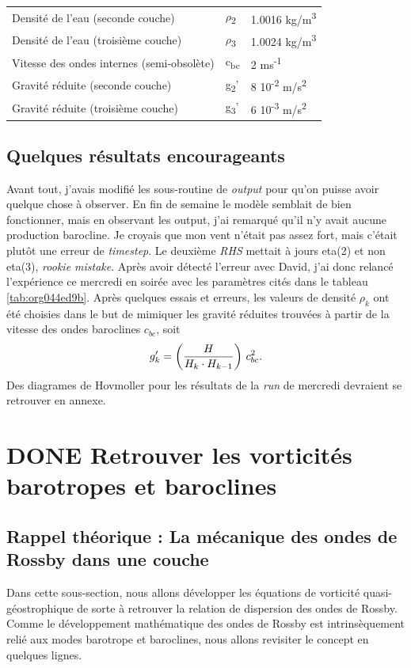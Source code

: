 \documentclass[10pt]{article}
\numberwithin{equation}{section}
\begin{document}
\begin{table}[htbp]
\begin{tabular}{lll}
Densité de l'eau (seconde couche) & \(\rho\)\textsubscript{2} & 1.0016 kg/m\textsuperscript{3}\\[0pt]
Densité de l'eau (troisième couche) & \(\rho\)\textsubscript{3} & 1.0024 kg/m\textsuperscript{3}\\[0pt]
Vitesse des ondes internes (semi-obsolète) & c\textsubscript{bc} & 2 ms\textsuperscript{-1}\\[0pt]
Gravité réduite (seconde couche) & g\textsubscript{2}' & 8 \texttimes{} 10\textsuperscript{-2} m/s\textsuperscript{2}\\[0pt]
Gravité réduite (troisième couche) & g\textsubscript{3}' & 6 \texttimes{} 10\textsuperscript{-3} m/s\textsuperscript{2}\\[0pt]
\hline
\hline
\end{tabular}
\end{table}

\subsection{Quelques résultats encourageants}
\label{sec:org3e2f45c}
Avant tout, j'avais modifié les sous-routine de \emph{output} pour qu'on puisse avoir quelque chose à observer.
En fin de semaine le modèle semblait de bien fonctionner, mais en observant les output, j'ai remarqué qu'il n'y avait aucune production barocline.
Je croyais que mon vent n'était pas assez fort, mais c'était plutôt une erreur de \emph{timestep}.
Le deuxième \emph{RHS} mettait à jours eta(2) et non eta(3), \emph{rookie mistake}.
Après avoir détecté l'erreur avec David, j'ai donc relancé l'expérience ce mercredi en soirée avec les paramètres cités dans le tableau \ref{tab:org044ed9b}.
Après quelques essais et erreurs, les valeurs de densité \(\rho_k\) ont été choisies dans le but de mimiquer les gravité réduites trouvées à partir de la vitesse des ondes baroclines \(c_{bc}\), soit
\begin{equation}
g_k' = \qty(\frac{H}{H_k\cdot H_{k-1}}) \ c_{bc}^2.
\end{equation}
Des diagrames de Hovmoller pour les résultats de la \emph{run} de mercredi devraient se retrouver en annexe.

\section{{\bfseries\sffamily DONE} Retrouver les vorticités barotropes et baroclines}
\label{sec:org726ff87}
\subsection{\textbf{Rappel théorique} :  La mécanique des ondes de Rossby dans une couche}
\label{sec:org849eccc}
Dans cette sous-section, nous allons développer les équations de vorticité quasi-géostrophique de sorte à retrouver la relation de dispersion des ondes de Rossby.
Comme le développement mathématique des ondes de Rossby est intrinsèquement relié aux modes barotrope et baroclines, nous allons revisiter le concept en quelques lignes.\bigskip
\end{document}
